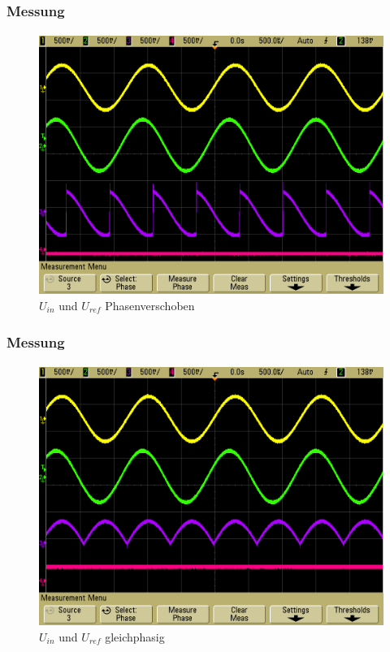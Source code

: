 \begin{frame}
    \frametitle{Messung}
    \framesubtitle{}
     \begin{figure}[H]
     \begin{center}
             \includegraphics[scale=0.2]{./img/oszi/scope_18.png}
     \end{center}
     \caption{$U_{in}$ und $U_{ref}$ Phasenverschoben}
     \end{figure}
\end{frame}
\begin{frame}
    \frametitle{Messung}
    \framesubtitle{}
    \begin{figure}[H]
    \begin{center}
            \includegraphics[scale=0.2]{./img/oszi/scope_17.png}
    \end{center}
     \caption{$U_{in}$ und $U_{ref}$ gleichphasig}
    \end{figure}
\end{frame}
